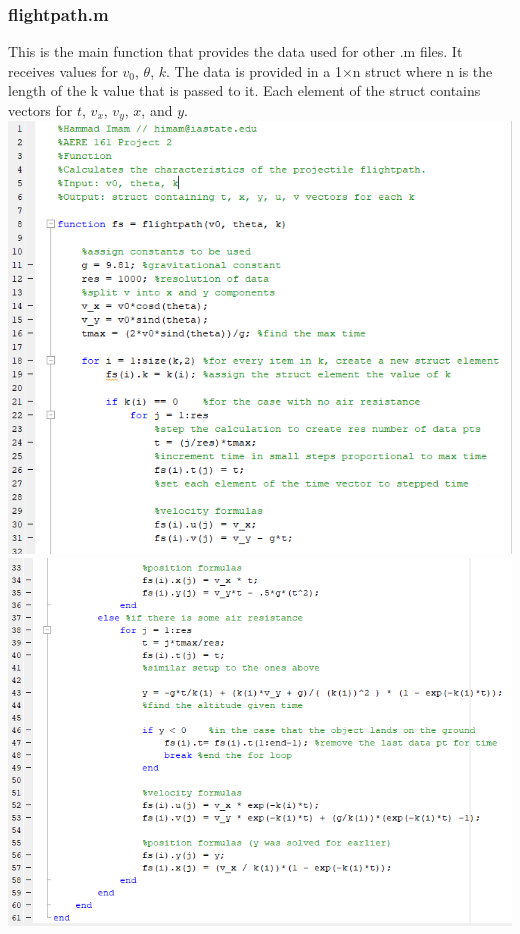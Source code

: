 \documentclass[oneside]{article}
\begin{document}
\subsubsection{flightpath.m}
This is the main function that provides the data used for other .m files. It receives values for $v_0$, $\theta$, $k$. The data is provided in a 1$\times$n struct where n is the length of the k value that is passed to it. Each element of the struct contains vectors for $t$, $v_x$, $v_y$, $x$, and $y$.\\ 
\includegraphics [width=\linewidth]{code_flightpath1.png}
\includegraphics [width=\linewidth]{code_flightpath2.png}
\end{document}
